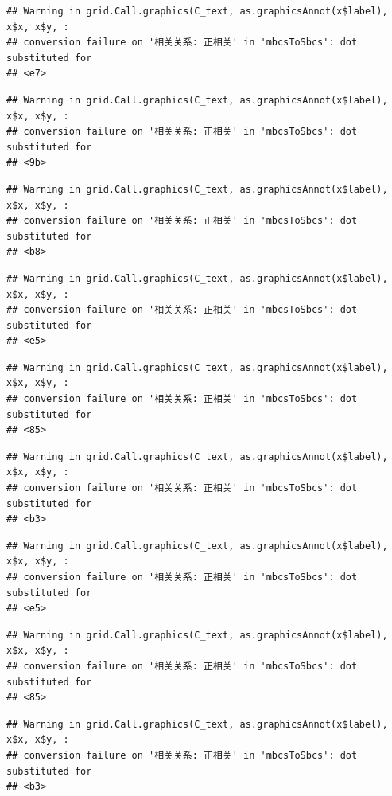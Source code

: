 \documentclass[
]{book}
\begin{document}
\begin{verbatim}
## Warning in grid.Call.graphics(C_text, as.graphicsAnnot(x$label), x$x, x$y, :
## conversion failure on '相关关系: 正相关' in 'mbcsToSbcs': dot substituted for
## <e7>
\end{verbatim}

\begin{verbatim}
## Warning in grid.Call.graphics(C_text, as.graphicsAnnot(x$label), x$x, x$y, :
## conversion failure on '相关关系: 正相关' in 'mbcsToSbcs': dot substituted for
## <9b>
\end{verbatim}

\begin{verbatim}
## Warning in grid.Call.graphics(C_text, as.graphicsAnnot(x$label), x$x, x$y, :
## conversion failure on '相关关系: 正相关' in 'mbcsToSbcs': dot substituted for
## <b8>
\end{verbatim}

\begin{verbatim}
## Warning in grid.Call.graphics(C_text, as.graphicsAnnot(x$label), x$x, x$y, :
## conversion failure on '相关关系: 正相关' in 'mbcsToSbcs': dot substituted for
## <e5>
\end{verbatim}

\begin{verbatim}
## Warning in grid.Call.graphics(C_text, as.graphicsAnnot(x$label), x$x, x$y, :
## conversion failure on '相关关系: 正相关' in 'mbcsToSbcs': dot substituted for
## <85>
\end{verbatim}

\begin{verbatim}
## Warning in grid.Call.graphics(C_text, as.graphicsAnnot(x$label), x$x, x$y, :
## conversion failure on '相关关系: 正相关' in 'mbcsToSbcs': dot substituted for
## <b3>
\end{verbatim}

\begin{verbatim}
## Warning in grid.Call.graphics(C_text, as.graphicsAnnot(x$label), x$x, x$y, :
## conversion failure on '相关关系: 正相关' in 'mbcsToSbcs': dot substituted for
## <e5>
\end{verbatim}

\begin{verbatim}
## Warning in grid.Call.graphics(C_text, as.graphicsAnnot(x$label), x$x, x$y, :
## conversion failure on '相关关系: 正相关' in 'mbcsToSbcs': dot substituted for
## <85>
\end{verbatim}

\begin{verbatim}
## Warning in grid.Call.graphics(C_text, as.graphicsAnnot(x$label), x$x, x$y, :
## conversion failure on '相关关系: 正相关' in 'mbcsToSbcs': dot substituted for
## <b3>
\end{verbatim}
\end{document}
